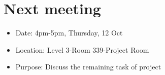\documentclass[11pt, a4paper]{article}
\begin{document}


\section{Next meeting}
\begin{itemize}
\item Date: 4pm-5pm, Thursday, 12 Oct
\item Location: Level 3-Room 339-Project Room
\item Purpose: Discuss the remaining task of project
\end{itemize}

\vspace*{10pt}
\end{document}

